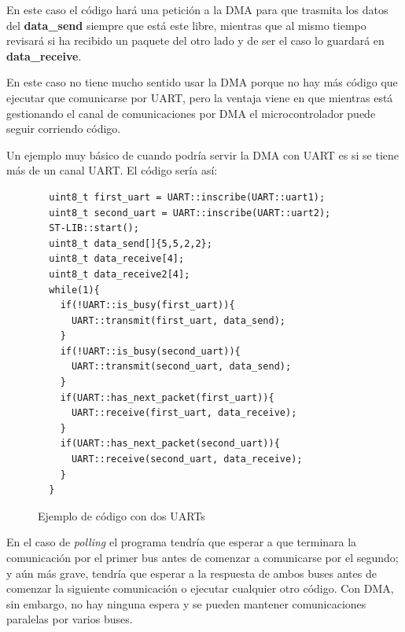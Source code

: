 \documentclass{report}
\begin{document}
En este caso el código hará una petición a la DMA para que trasmita los datos del \textbf{data\_send} siempre que está este libre, mientras que al mismo tiempo revisará si ha recibido un paquete del otro lado y de ser el caso lo guardará en \textbf{data\_receive}. \par En este caso no tiene mucho sentido usar la DMA porque no hay más código que ejecutar que comunicarse por UART, pero la ventaja viene en que mientras está gestionando el canal de comunicaciones por DMA el microcontrolador puede seguir corriendo código. \par \vspace{0.3cm}
Un ejemplo muy básico de cuando podría servir la DMA con UART es si se tiene más de un canal UART. El código sería así: 
\begin{figure}[h]
\begin{lstlisting}
  uint8_t first_uart = UART::inscribe(UART::uart1);
  uint8_t second_uart = UART::inscribe(UART::uart2);
  ST-LIB::start();
  uint8_t data_send[]{5,5,2,2};
  uint8_t data_receive[4];
  uint8_t data_receive2[4];
  while(1){
    if(!UART::is_busy(first_uart)){
      UART::transmit(first_uart, data_send);
    }
    if(!UART::is_busy(second_uart)){
      UART::transmit(second_uart, data_send);
    }
    if(UART::has_next_packet(first_uart)){
      UART::receive(first_uart, data_receive);
    }
    if(UART::has_next_packet(second_uart)){
      UART::receive(second_uart, data_receive);
    }
  }
\end{lstlisting}
\caption{Ejemplo de código con dos UARTs}
  \label{twoUARTcode}
\end{figure}
\par \vspace{0.3cm}
En el caso de \textit{polling} el programa tendría que esperar a que terminara la comunicación por el primer bus antes de comenzar a comunicarse por el segundo; y aún más grave, tendría que esperar a la respuesta de ambos buses antes de comenzar la siguiente comunicación o ejecutar cualquier otro código. Con DMA, sin embargo, no hay ninguna espera y se pueden mantener comunicaciones paralelas por varios buses. 
\end{document}

